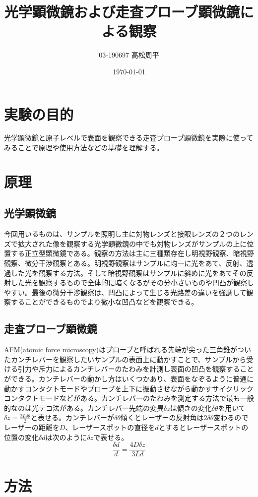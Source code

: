 \documentclass{jsarticle}
\title{光学顕微鏡および走査プローブ顕微鏡による観察}
\author{03-190697 高松周平}
\date{\today}
\begin{document}
\maketitle
\section{実験の目的}
光学顕微鏡と原子レベルで表面を観察できる走査プローブ顕微鏡を実際に使ってみることで原理や使用方法などの基礎を理解する。
\section{原理}
\subsection{光学顕微鏡}
今回用いるものは、サンプルを照明し主に対物レンズと接眼レンズの２つのレンズで拡大された像を観察する光学顕微鏡の中でも対物レンズがサンプルの上に位置する正立型顕微鏡である。観察の方法は主に三種類存在し明視野観察、暗視野観察、微分干渉観察とある。明視野観察はサンプルに均一に光をあて、反射、透過した光を観察する方法。そして暗視野観察はサンプルに斜めに光をあてその反射した光を観察するもので全体的に暗くなるがその分小さいものや凹凸が観察しやすい。最後の微分干渉観察は、凹凸によって生じる光路差の違いを強調して観察することができるものでより微小な凹凸などを観察できる。
\subsection{走査プローブ顕微鏡}
AFM(atomic force microscopy)はプローブと呼ばれる先端が尖った三角錐がついたカンチレバーを観察したいサンプルの表面上に動かすことで、サンプルから受ける引力や斥力によるカンチレバーのたわみを計測し表面の凹凸を観察することができる。カンチレバーの動かし方はいくつかあり、表面をなぞるように普通に動かすコンタクトモードやプローブを上下に振動させながら動かすサイクリックコンタクトモードなどがある。カンチレバーのたわみを測定する方法で最も一般的なのは光テコ法がある。カンチレバー先端の変異$\delta z$は傾きの変化$\delta\theta$を用いて$\delta z = \frac{3L\delta\theta}{2}$と表せる。カンチレバーが$\delta\theta$傾くとレーザーの反射角は$2\delta\theta$変わるのでレーザーの距離を$D$、レーザースポットの直径を$d$とするとレーザースポットの位置の変化$\delta d$は次のように$\delta z$で表せる。
$$
\frac{\delta d}{d} = \frac{4D\delta z}{3Ld}
$$
\section{方法}
\end{document}
